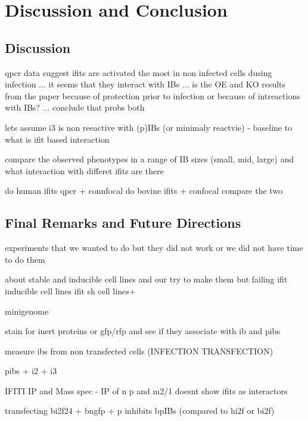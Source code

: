 \chapter{Discussion and Conclusion}
\section{Discussion}

qpcr data suggest ifits are activated the most in non infected cells dusing infection ... it seems that they interact with IBs ... is the OE and KO results from the paper because of protection prior to infection or because of intreactions with IBs? ... conclude that probs both


lets assume i3 is non reeactive with (p)IBs (or minimaly reactvie) - baseline to what is ifit based interaction

compare the observed phenotypes in a range of IB sizes (small, mid, large) and what interaction with differet ifits are there

do human ifits qpcr + connfocal
do bovine ifits  + confocal
compare the two


\section{Final Remarks and Future Directions}
experiments that we wanted to do but they did not work or we did not have time to do them


about stable and inducible cell lines and our try to make them but failing
ifit inducible cell lines
ifit sh cell lines+

minigenome

stain for inert proteins or gfp/rfp and see if they associate with ib and pibs

measure ibs from non transfected cells (INFECTION TRANSFECTION)


pibs + i2 + i3

IFITI IP and Mass spec
\cite{Oliveira2013HumanCells} - IP of n p and m2/1 doesnt show ifits as interactors

transfecting bi2f24 + bngfp + p inhibits bpIBs (compared to hi2f or bi2f)



